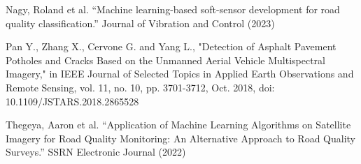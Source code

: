 \documentclass{article}
\begin{document}
\begin{hangparas}{.3in}{1}
{Nagy, Roland et al. “Machine learning-based soft-sensor development for road quality classification.” Journal of Vibration and Control (2023)

Pan Y.,  Zhang X., Cervone G.  and Yang L., "Detection of Asphalt Pavement Potholes and Cracks Based on the Unmanned Aerial Vehicle Multispectral Imagery," in IEEE Journal of Selected Topics in Applied Earth Observations and Remote Sensing, vol. 11, no. 10, pp. 3701-3712, Oct. 2018, doi: 10.1109/JSTARS.2018.2865528

Thegeya, Aaron et al. “Application of Machine Learning Algorithms on Satellite Imagery for Road Quality Monitoring: An Alternative Approach to Road Quality Surveys.” SSRN Electronic Journal (2022)


}
\end{hangparas}

\end{document}
